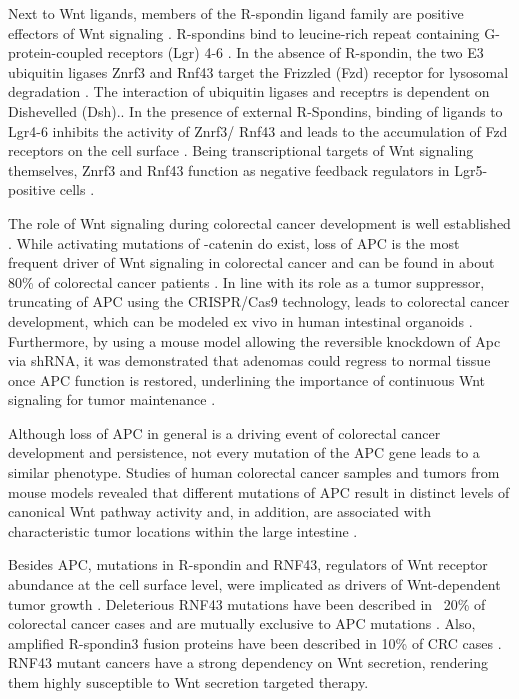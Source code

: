 \begin{flushleft}
Next to Wnt ligands, members of the R-spondin ligand family are positive effectors of Wnt signaling \cite{Kazanskaya2004, Glinka2011, Hao2012}. R-spondins bind to leucine-rich repeat containing G-protein-coupled receptors (Lgr) 4-6 \cite{Koo2012a}. In the absence of R-spondin, the two E3 ubiquitin ligases Znrf3 and Rnf43 target the Frizzled (Fzd) receptor for lysosomal degradation \cite{DeLau2011}. The interaction of ubiquitin ligases and receptrs is dependent on Dishevelled (Dsh).\cite{Jiang2015}. In the presence of external R-Spondins, binding of ligands to Lgr4-6 inhibits the activity of Znrf3/ Rnf43 and leads to the accumulation of Fzd receptors on the cell surface \cite{Hao2012, Koo2012a}. Being transcriptional targets of Wnt signaling themselves, Znrf3 and Rnf43 function as negative feedback regulators in Lgr5- positive cells \cite{DeLau2012}. \par 

The role of Wnt signaling during colorectal cancer development is well established \cite{Polakis2007}. While activating mutations of \textbeta-catenin do exist, loss of APC is the most frequent driver of Wnt signaling in colorectal cancer and can be found in about 80\% of colorectal cancer patients \cite{Fearon1989}. In line with its role as a tumor suppressor, truncating of APC using the CRISPR/Cas9 technology, leads to colorectal cancer development, which can be modeled ex vivo in human intestinal organoids \cite{Matano2015, Drost2015SequentialCells}. Furthermore, by using a mouse model allowing the reversible knockdown of Apc via shRNA, it was demonstrated that adenomas could regress to normal tissue once APC function is restored, underlining the importance of continuous Wnt signaling for tumor maintenance \cite{Dow2015}. \par
Although loss of APC in general is a driving event of colorectal cancer development and persistence, not every mutation of the APC gene leads to a similar phenotype. Studies of human colorectal cancer samples and tumors from mouse models revealed that different mutations of APC result in distinct levels of canonical Wnt pathway activity and, in addition, are associated with characteristic tumor locations within the large intestine \cite{Christie2013, Buchert2010}. \par

Besides APC, mutations in R-spondin and RNF43, regulators of Wnt receptor abundance at the cell surface level, 
were implicated as drivers of Wnt-dependent tumor growth \cite{Lau2014-zg}. Deleterious RNF43 mutations have been described in ~20\% of colorectal cancer cases and are mutually exclusive to APC mutations \cite{Giannakis2014-oq}. Also, amplified R-spondin3 fusion proteins have been described in 10\% of CRC cases \cite{R-spondin3}. RNF43 mutant cancers have a strong dependency on Wnt secretion, rendering them highly susceptible to Wnt secretion targeted therapy.


\end{flushleft}
